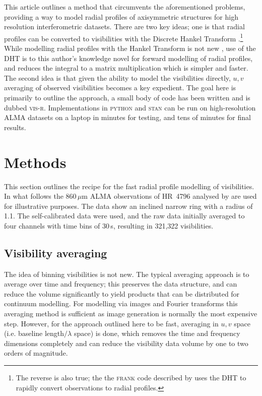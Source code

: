 \documentclass[fleqn,usenatbib]{mnras}
\begin{document}
This article outlines a method that circumvents the aforementioned problems, providing a way to model radial profiles of axisymmetric structures for high resolution interferometric datasets. There are two key ideas; one is that radial profiles can be converted to visibilities with the Discrete Hankel Transform \citep[DHT,][]{2015JOSAA..32..611B}.\footnote{The reverse is also true; the the \textsc{frank} code described by \citet{2020MNRAS.tmp.1491J} uses the DHT to rapidly convert observations to radial profiles.}  While modelling radial profiles with the Hankel Transform is not new \citep[e.g.][]{2018ApJ...869L..48G}, use of the DHT is to this author's knowledge novel for forward modelling of radial profiles, and reduces the integral to a matrix multiplication which is simpler and faster. The second idea is that given the ability to model the visibilities directly, $u,v$ averaging of observed visibilities becomes a key expedient. The goal here is primarily to outline the approach, a small body of code has been written and is dubbed \textsc{vis-r}. Implementations in \textsc{python} and \textsc{stan} can be run on high-resolution ALMA datasets on a laptop in minutes for testing, and tens of minutes for final results.

\section{Methods}

This section outlines the recipe for the fast radial profile modelling of visibilities. In what follows the 860\,$\mu$m ALMA observations of HR~4796 analysed by \citet{2018MNRAS.475.4924K} are used for illustrative purposes. The data show an inclined narrow ring with a radius of 1.1\arcsec. The self-calibrated data were used, and the raw data initially averaged to four channels with time bins of 30\,s, resulting in 321,322 visibilities.

\subsection{Visibility averaging}\label{sec:avg}

The idea of binning visibilities is not new. The typical averaging approach is to average over time and frequency; this preserves the data structure, and can reduce the volume significantly to yield products that can be distributed for continuum modelling. For modelling via images and Fourier transforms this averaging method is sufficient as image generation is normally the most expensive step. However, for the approach outlined here to be fast, averaging in $u,v$ space (i.e. baseline length$/\lambda$ space) is done, which removes the time and frequency dimensions completely and can reduce the visibility data volume by one to two orders of magnitude.
\end{document}
